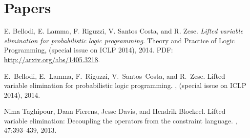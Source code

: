 \documentclass{article}
\begin{document}
\section{Papers}
E. Bellodi, E. Lamma, F. Riguzzi, V. Santos Costa, and R. Zese. \textit{Lifted variable elimination for probabilistic logic programming}. Theory and Practice
of Logic Programming, (special issue on ICLP 2014), 2014. PDF: \url{http://arxiv.org/abs/1405.3218}.


\begin{thebibliography}{1}

E.~Bellodi, E.~Lamma, F.~Riguzzi, V.~Santos~Costa, and R.~Zese.
\newblock Lifted variable elimination for probabilistic logic programming.
, (special issue on
  ICLP 2014), 2014.

Nima Taghipour, Daan Fierens, Jesse Davis, and Hendrik Blockeel.
\newblock Lifted variable elimination: Decoupling the operators from the
  constraint language.
, 47:393--439, 2013.

\end{thebibliography}
\end{document}
